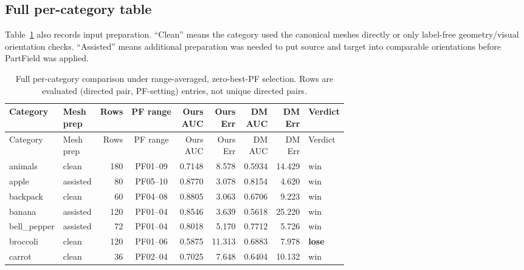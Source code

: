 \documentclass{article}
\newcommand{\Err}{Err}
\newcommand{\AUC}{AUC}
\begin{document}
\subsection{Full per-category table}

Table~\ref{tab:densematcher-full} also records input preparation. ``Clean'' means the category
used the canonical meshes directly or only label-free geometry/visual orientation checks.
``Assisted'' means additional preparation was needed to put source and target into comparable
orientations before PartField was applied.

\begingroup
\scriptsize
\setlength{\tabcolsep}{2.5pt}
\begin{longtable}{@{}l>{\raggedright\arraybackslash}p{1.75cm}rcrrrrl@{}}
\caption{Full per-category comparison under range-averaged, zero-best-PF selection. Rows are
evaluated (directed pair, PF-setting) entries, not unique directed pairs.}
\label{tab:densematcher-full}\\
\toprule
Category & \shortstack{Mesh\\prep} & Rows & PF range & \shortstack{Ours\\AUC} & \shortstack{Ours\\Err} & \shortstack{DM\\AUC} & \shortstack{DM\\Err} & Verdict \\
\midrule
\endfirsthead
\toprule
Category & \shortstack{Mesh\\prep} & Rows & PF range & \shortstack{Ours\\AUC} & \shortstack{Ours\\Err} & \shortstack{DM\\AUC} & \shortstack{DM\\Err} & Verdict \\
\midrule
\endhead
animals & clean & 180 & PF01--09 & 0.7148 & 8.578 & 0.5934 & 14.429 & win \\
apple & assisted & 80 & PF05--10 & 0.8770 & 3.078 & 0.8154 & 4.620 & win \\
backpack & clean & 60 & PF04--08 & 0.8805 & 3.063 & 0.6706 & 9.223 & win \\
banana & assisted & 120 & PF01--04 & 0.8546 & 3.639 & 0.5618 & 25.220 & win \\
bell\_pepper & assisted & 72 & PF01--04 & 0.8018 & 5.170 & 0.7712 & 5.726 & win \\
broccoli & clean & 120 & PF01--06 & 0.5875 & 11.313 & 0.6883 & 7.978 & \textbf{lose} \\
carrot & clean & 36 & PF02--04 & 0.7025 & 7.648 & 0.6404 & 10.132 & win \\

\end{longtable}
\end{document}
